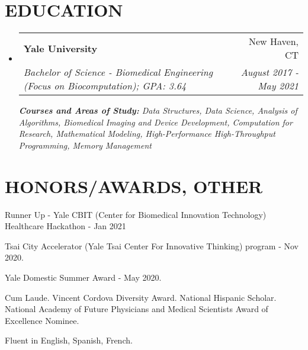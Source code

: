 \documentclass[a4paper,20pt]{article}
\makeatletter
\newcommand{\resumeSubheading}[4]{
  \vspace{2pt}\item[]
    \begin{tabular*}{0.97\textwidth}{l@{\extracolsep{\fill}}r}
      \textbf{#1} & #2 \\
      \textit{#3} & \textit{#4} \\
    \end{tabular*}\vspace{-2pt}
}
\newcommand{\resumeSubHeadingListStart}{\begin{itemize}[leftmargin=*]}
\newcommand{\resumeSubHeadingListEnd}{\end{itemize}}
\makeatother
\begin{document}
\section{\textbf{EDUCATION}}
\resumeSubHeadingListStart
    \vspace{2pt}\resumeSubheading
      {Yale University}{New Haven, CT}
      {Bachelor of Science - Biomedical Engineering (Focus on Biocomputation); GPA: 3.64}{August 2017 - May 2021}
      \vspace{2pt}
      {\scriptsize \textit{ \footnotesize{\newline{}\textbf{Courses and Areas of Study:}  Data Structures, Data Science, Analysis of Algorithms, Biomedical Imaging and Device Development, Computation for Research, Mathematical Modeling, High-Performance High-Throughput Programming}, Memory Management}}
\resumeSubHeadingListEnd

\vspace{6pt}
\section{\textbf{HONORS/AWARDS, OTHER}}
\begin{description}[font=$\bullet$]
\item {Runner Up - Yale CBIT (Center for Biomedical Innovation Technology) Healthcare Hackathon - Jan 2021
}
\vspace{-8pt}
\item {Tsai City Accelerator (Yale Tsai Center For Innovative Thinking) program - Nov 2020.}
\vspace{-8pt}
\item {Yale Domestic Summer Award - May 2020.}
\vspace{-8pt}
\item {Cum Laude. Vincent Cordova Diversity Award. National Hispanic Scholar. National Academy of Future Physicians and Medical Scientists Award of Excellence Nominee.}
\vspace{-8pt}
\item {Fluent in English, Spanish, French. }

\end{description}
\vspace{-5pt}
\end{document}
